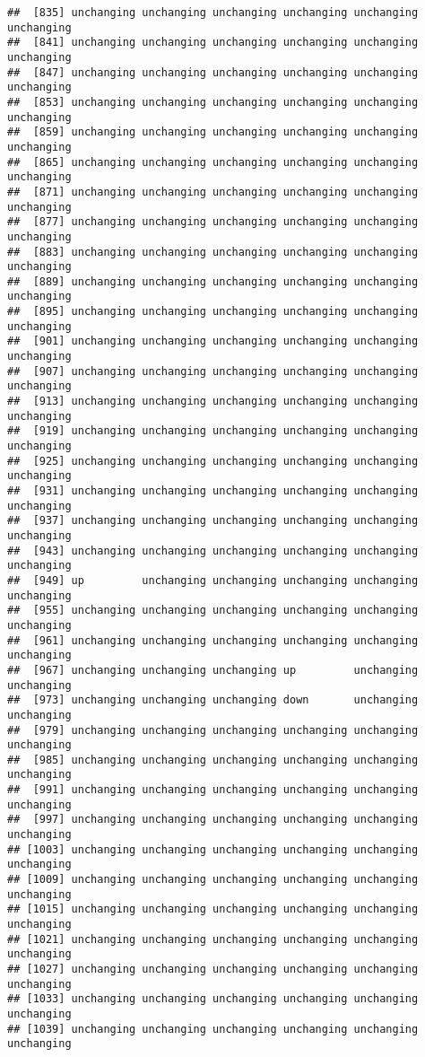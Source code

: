 \documentclass[]{article}
\begin{document}
\begin{verbatim}
##  [835] unchanging unchanging unchanging unchanging unchanging unchanging
##  [841] unchanging unchanging unchanging unchanging unchanging unchanging
##  [847] unchanging unchanging unchanging unchanging unchanging unchanging
##  [853] unchanging unchanging unchanging unchanging unchanging unchanging
##  [859] unchanging unchanging unchanging unchanging unchanging unchanging
##  [865] unchanging unchanging unchanging unchanging unchanging unchanging
##  [871] unchanging unchanging unchanging unchanging unchanging unchanging
##  [877] unchanging unchanging unchanging unchanging unchanging unchanging
##  [883] unchanging unchanging unchanging unchanging unchanging unchanging
##  [889] unchanging unchanging unchanging unchanging unchanging unchanging
##  [895] unchanging unchanging unchanging unchanging unchanging unchanging
##  [901] unchanging unchanging unchanging unchanging unchanging unchanging
##  [907] unchanging unchanging unchanging unchanging unchanging unchanging
##  [913] unchanging unchanging unchanging unchanging unchanging unchanging
##  [919] unchanging unchanging unchanging unchanging unchanging unchanging
##  [925] unchanging unchanging unchanging unchanging unchanging unchanging
##  [931] unchanging unchanging unchanging unchanging unchanging unchanging
##  [937] unchanging unchanging unchanging unchanging unchanging unchanging
##  [943] unchanging unchanging unchanging unchanging unchanging unchanging
##  [949] up         unchanging unchanging unchanging unchanging unchanging
##  [955] unchanging unchanging unchanging unchanging unchanging unchanging
##  [961] unchanging unchanging unchanging unchanging unchanging unchanging
##  [967] unchanging unchanging unchanging up         unchanging unchanging
##  [973] unchanging unchanging unchanging down       unchanging unchanging
##  [979] unchanging unchanging unchanging unchanging unchanging unchanging
##  [985] unchanging unchanging unchanging unchanging unchanging unchanging
##  [991] unchanging unchanging unchanging unchanging unchanging unchanging
##  [997] unchanging unchanging unchanging unchanging unchanging unchanging
## [1003] unchanging unchanging unchanging unchanging unchanging unchanging
## [1009] unchanging unchanging unchanging unchanging unchanging unchanging
## [1015] unchanging unchanging unchanging unchanging unchanging unchanging
## [1021] unchanging unchanging unchanging unchanging unchanging unchanging
## [1027] unchanging unchanging unchanging unchanging unchanging unchanging
## [1033] unchanging unchanging unchanging unchanging unchanging unchanging
## [1039] unchanging unchanging unchanging unchanging unchanging unchanging

\end{verbatim}
\end{document}
